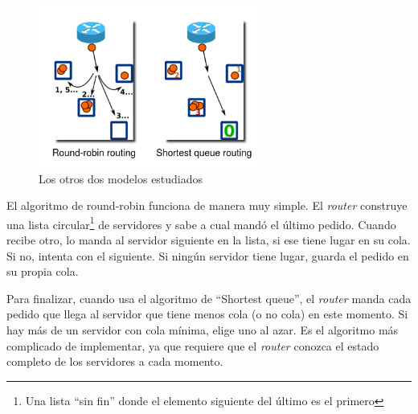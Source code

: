 \begin{figure}[h]
    \centering
    \includegraphics[height=200px]{round-robin--shortest-queue.png}
    \caption{Los otros dos modelos estudiados}
    \label{fig:round_robin+shortest_queue}
\end{figure}


El algoritmo de round-robin funciona de manera muy simple. El \textit{router} construye una lista circular\footnote{Una 
lista ``sin fin'' donde el elemento siguiente del último es el primero} de servidores y sabe a cual mandó el último pedido. 
Cuando recibe otro, lo manda al servidor siguiente en la lista, si ese tiene lugar en su cola. Si no, intenta con el
siguiente. Si ningún servidor tiene lugar, guarda el pedido en su propia cola.

Para finalizar, cuando usa el algoritmo de ``Shortest queue'', el \textit{router} manda cada pedido que llega al
servidor que tiene menos cola (o no cola) en este momento. Si hay más de un servidor con cola mínima, elige uno al
azar. Es el algoritmo más complicado de implementar, ya que requiere que el \textit{router} conozca el estado completo
de los servidores a cada momento.


